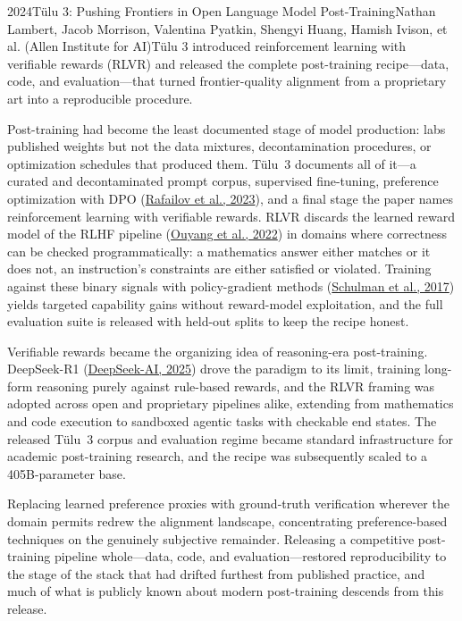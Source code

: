 
\begin{papersummary}{2024}{T\"ulu 3: Pushing Frontiers in Open Language Model Post-Training}{Nathan Lambert, Jacob Morrison, Valentina Pyatkin, Shengyi Huang, Hamish Ivison, et al. (Allen Institute for AI)}{T\"ulu 3 introduced reinforcement learning with verifiable rewards (RLVR) and released the complete post-training recipe---data, code, and evaluation---that turned frontier-quality alignment from a proprietary art into a reproducible procedure.}

Post-training had become the least documented stage of model production: labs published weights but not the data mixtures, decontamination procedures, or optimization schedules that produced them. T\"ulu~3 documents all of it---a curated and decontaminated prompt corpus, supervised fine-tuning, preference optimization with DPO (\hyperref[paper:rafailov-2023-dpo]{Rafailov et al., 2023}), and a final stage the paper names reinforcement learning with verifiable rewards. RLVR discards the learned reward model of the RLHF pipeline (\hyperref[paper:ouyang-2022]{Ouyang et al., 2022}) in domains where correctness can be checked programmatically: a mathematics answer either matches or it does not, an instruction's constraints are either satisfied or violated. Training against these binary signals with policy-gradient methods (\hyperref[paper:schulman-2017-ppo]{Schulman et al., 2017}) yields targeted capability gains without reward-model exploitation, and the full evaluation suite is released with held-out splits to keep the recipe honest.

Verifiable rewards became the organizing idea of reasoning-era post-training. DeepSeek-R1 (\hyperref[paper:deepseek-2025-r1]{DeepSeek-AI, 2025}) drove the paradigm to its limit, training long-form reasoning purely against rule-based rewards, and the RLVR framing was adopted across open and proprietary pipelines alike, extending from mathematics and code execution to sandboxed agentic tasks with checkable end states. The released T\"ulu~3 corpus and evaluation regime became standard infrastructure for academic post-training research, and the recipe was subsequently scaled to a 405B-parameter base.

Replacing learned preference proxies with ground-truth verification wherever the domain permits redrew the alignment landscape, concentrating preference-based techniques on the genuinely subjective remainder. Releasing a competitive post-training pipeline whole---data, code, and evaluation---restored reproducibility to the stage of the stack that had drifted furthest from published practice, and much of what is publicly known about modern post-training descends from this release.

\end{papersummary}
